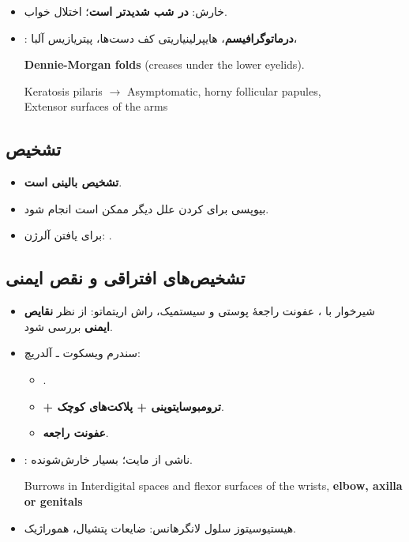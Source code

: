 \documentclass[12pt,a4paper]{article}
\begin{document}
\clearpage
{}
\begin{itemize}
\item خارش: \textbf{در شب شدیدتر است}؛ اختلال خواب.
\item {}: \textbf{درماتوگرافیسم}، هایپرلینیاریتی کف دست‌ها، پیتریازیس آلبا،
\begin{latin}
\textbf{Dennie-Morgan folds} (creases under the lower eyelids).

Keratosis pilaris $\longrightarrow$ Asymptomatic, horny follicular papules,\\
Extensor surfaces of the arms
\end{latin}
\end{itemize}

\subsection*{تشخیص}
\begin{itemize}
\item \textbf{تشخیص  بالینی است}.
\item بیوپسی برای  کردن علل دیگر ممکن است انجام شود.
\item برای یافتن آلرژن: .
\end{itemize}

\subsection*{تشخیص‌های افتراقی و نقص ایمنی}
\begin{itemize}
\item شیرخوار با ، عفونت راجعهٔ پوستی و سیستمیک، راش اریتماتو: از نظر \textbf{نقایص ایمنی} بررسی شود.
\item سندرم ویسکوت ـ آلدریچ:
\begin{itemize}
\item \textbf{}.
\item \textbf{ + ترومبوسایتوپنی + پلاکت‌های کوچک}.
\item \textbf{عفونت راجعه}.
\end{itemize}
\item {}: ناشی از مایت؛ بسیار خارش‌شونده.
\begin{latin}
Burrows in Interdigital spaces and flexor surfaces of the wrists, \textbf{elbow, axilla or genitals}
\end{latin}
\item هیستیوسیتوز سلول لانگرهانس: ضایعات پتشیال، هموراژیک.
\end{itemize}
\end{document}
